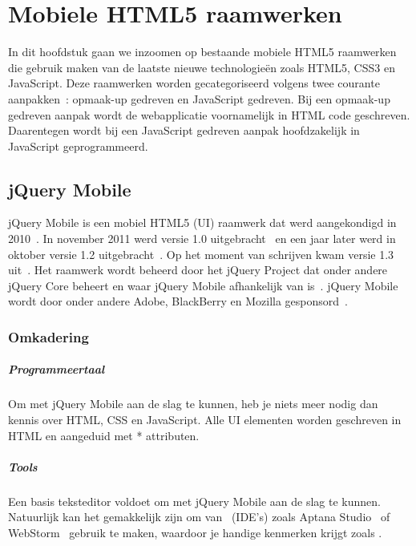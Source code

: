 \chapter{Mobiele HTML5 raamwerken}
\label{chap:raamwerken}
In dit hoofdstuk gaan we inzoomen op bestaande mobiele HTML5 raamwerken die gebruik maken van de laatste nieuwe technologieën zoals HTML5, CSS3 en JavaScript. Deze raamwerken worden gecategoriseerd volgens twee courante aanpakken~\cite{Oeflman2011}: opmaak-up gedreven en JavaScript gedreven. Bij een opmaak-up gedreven aanpak wordt de webapplicatie voornamelijk in HTML code geschreven. Daarentegen wordt bij een JavaScript gedreven aanpak hoofdzakelijk in JavaScript geprogrammeerd.

\section{jQuery Mobile}
jQuery Mobile is een mobiel HTML5  (UI) raamwerk dat werd aangekondigd in 2010~\cite{Resig2010}. In november 2011 werd versie 1.0 uitgebracht~\cite{Parker2011} en een jaar later werd in oktober versie 1.2 uitgebracht~\cite{Parker2012}. Op het moment van schrijven kwam versie 1.3 uit~\cite{Parker2013a}. Het raamwerk wordt beheerd door het jQuery Project dat onder andere jQuery Core beheert en waar jQuery Mobile afhankelijk van is~\cite{JQuery2012}. jQuery Mobile wordt door onder andere Adobe, BlackBerry en Mozilla gesponsord~\cite{JQuery2012a}.

\subsection{Omkadering}
\paragraph{Programmeertaal}
Om met jQuery Mobile aan de slag te kunnen, heb je niets meer nodig dan kennis over HTML, CSS en JavaScript. Alle UI elementen worden geschreven in HTML en aangeduid met * attributen.

\paragraph{Tools}
Een basis teksteditor voldoet om met jQuery Mobile aan de slag te kunnen. Natuurlijk kan het gemakkelijk zijn om van ~(IDE's) zoals Aptana Studio~\cite{Aptana2012} of WebStorm~\cite{JetBrains2012} gebruik te maken, waardoor je handige kenmerken krijgt zoals .

